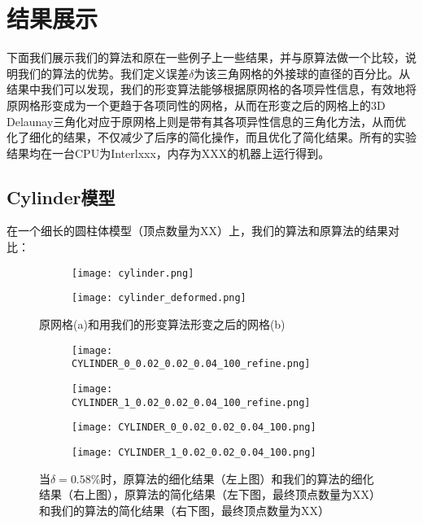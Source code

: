 \chapter{结果展示}
下面我们展示我们的算法和原在一些例子上一些结果，并与原算法做一个比较，说明我们的算法的优势。我们定义误差$\delta$为该三角网格的外接球的直径的百分比。从结果中我们可以发现，我们的形变算法能够根据原网格的各项异性信息，有效地将原网格形变成为一个更趋于各项同性的网格，从而在形变之后的网格上的3D Delaunay三角化对应于原网格上则是带有其各项异性信息的三角化方法，从而优化了细化的结果，不仅减少了后序的简化操作，而且优化了简化结果。所有的实验结果均在一台CPU为Interlxxx，内存为XXX的机器上运行得到。

\section{Cylinder模型}
在一个细长的圆柱体模型（顶点数量为XX）上，我们的算法和原算法的结果对比：
\begin{figure}[htbp]
  \centering
  \begin{subfigure}[b]{0.4\textwidth}
    \texttt{[image: cylinder.png]}
    \end{subfigure}
    \begin{subfigure}[b]{0.4\textwidth}
      \texttt{[image: cylinder\_deformed.png]}
    \end{subfigure}
    \caption[Cylinder形变结果]{原网格(a)和用我们的形变算法形变之后的网格(b)}
    \label{fig:cylinder-deform}
\end{figure}


\begin{figure}[htbp]
  \centering
  \begin{subfigure}[b]{0.4\textwidth}
    \texttt{[image: CYLINDER\_0\_0.02\_0.02\_0.04\_100\_refine.png]}
  \end{subfigure}
  \begin{subfigure}[b]{0.4\textwidth}
    \texttt{[image: CYLINDER\_1\_0.02\_0.02\_0.04\_100\_refine.png]}
  \end{subfigure}
  \begin{subfigure}[b]{0.4\textwidth}
    \texttt{[image: CYLINDER\_0\_0.02\_0.02\_0.04\_100.png]}
  \end{subfigure}
  \begin{subfigure}[b]{0.4\textwidth}
    \texttt{[image: CYLINDER\_1\_0.02\_0.02\_0.04\_100.png]}
  \end{subfigure}
  \caption[当$\delta=0.58\%$时Cylinder结果对比]{当$\delta=0.58\%$时，原算法的细化结果（左上图）和我们的算法的细化结果（右上图），原算法的简化结果（左下图，最终顶点数量为XX）和我们的算法的简化结果（右下图，最终顶点数量为XX）}
  \label{fig:cylinder-res1}
\end{figure}

